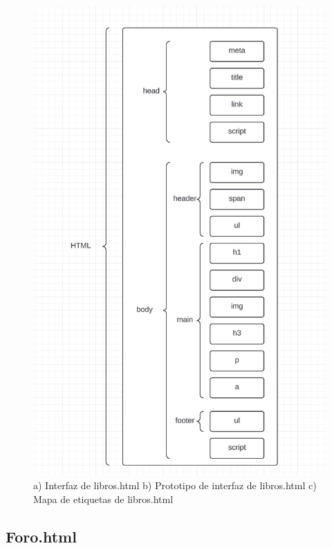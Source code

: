 \documentclass{article}
\begin{document}
\begin{figure}[H]
    \vspace{5mm}
    
    \includegraphics[width=\textwidth, height=0.5\textheight, keepaspectratio]{htmlFotos/MElibros.jpg}
    \caption{a) Interfaz de libros.html b) Prototipo de interfaz de libros.html c) Mapa de etiquetas de libros.html}
    \label{fig:imagenes_conjuntas}
\end{figure}

\subsection*{Foro.html}
\end{document}
